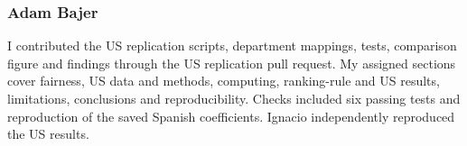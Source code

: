 \subsubsection*{Adam Bajer}
I contributed the US replication scripts, department mappings, tests, comparison figure and findings through the US replication pull request. My assigned sections cover fairness, US data and methods, computing, ranking-rule and US results, limitations, conclusions and reproducibility. Checks included six passing tests and reproduction of the saved Spanish coefficients. Ignacio independently reproduced the US results.
